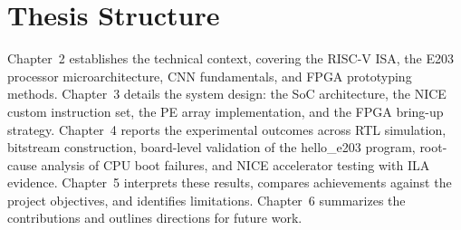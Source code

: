 \section{Thesis Structure}\label{sec:1_5}

Chapter~2 establishes the technical context, covering the RISC-V ISA, the E203 processor microarchitecture, CNN fundamentals, and FPGA prototyping methods. Chapter~3 details the system design: the SoC architecture, the NICE custom instruction set, the PE array implementation, and the FPGA bring-up strategy. Chapter~4 reports the experimental outcomes across RTL simulation, bitstream construction, board-level validation of the hello\_e203 program, root-cause analysis of CPU boot failures, and NICE accelerator testing with ILA evidence. Chapter~5 interprets these results, compares achievements against the project objectives, and identifies limitations. Chapter~6 summarizes the contributions and outlines directions for future work.


